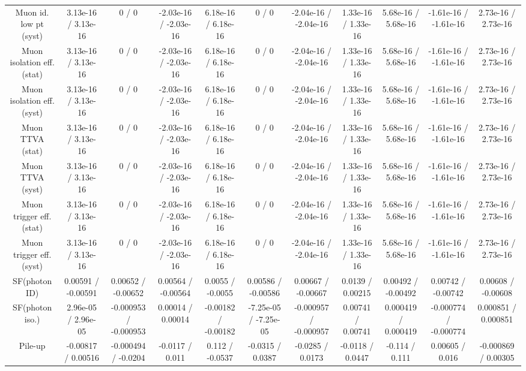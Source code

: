 \begin{table}[htbp]
\begin{center}
\begin{tabular}{|c|c|c|c|c|c|c|c|c|c|c|}
  Muon id. low pt (syst) & 3.13e-16 / 3.13e-16 & 0 / 0 & -2.03e-16 / -2.03e-16 & 6.18e-16 / 6.18e-16 & 0 / 0 & -2.04e-16 / -2.04e-16 & 1.33e-16 / 1.33e-16 & 5.68e-16 / 5.68e-16 & -1.61e-16 / -1.61e-16 & 2.73e-16 / 2.73e-16 \\ 
  Muon isolation eff. (stat) & 3.13e-16 / 3.13e-16 & 0 / 0 & -2.03e-16 / -2.03e-16 & 6.18e-16 / 6.18e-16 & 0 / 0 & -2.04e-16 / -2.04e-16 & 1.33e-16 / 1.33e-16 & 5.68e-16 / 5.68e-16 & -1.61e-16 / -1.61e-16 & 2.73e-16 / 2.73e-16 \\ 
  Muon isolation eff. (syst) & 3.13e-16 / 3.13e-16 & 0 / 0 & -2.03e-16 / -2.03e-16 & 6.18e-16 / 6.18e-16 & 0 / 0 & -2.04e-16 / -2.04e-16 & 1.33e-16 / 1.33e-16 & 5.68e-16 / 5.68e-16 & -1.61e-16 / -1.61e-16 & 2.73e-16 / 2.73e-16 \\ 
  Muon TTVA (stat) & 3.13e-16 / 3.13e-16 & 0 / 0 & -2.03e-16 / -2.03e-16 & 6.18e-16 / 6.18e-16 & 0 / 0 & -2.04e-16 / -2.04e-16 & 1.33e-16 / 1.33e-16 & 5.68e-16 / 5.68e-16 & -1.61e-16 / -1.61e-16 & 2.73e-16 / 2.73e-16 \\ 
  Muon TTVA (syst) & 3.13e-16 / 3.13e-16 & 0 / 0 & -2.03e-16 / -2.03e-16 & 6.18e-16 / 6.18e-16 & 0 / 0 & -2.04e-16 / -2.04e-16 & 1.33e-16 / 1.33e-16 & 5.68e-16 / 5.68e-16 & -1.61e-16 / -1.61e-16 & 2.73e-16 / 2.73e-16 \\ 
  Muon trigger eff. (stat) & 3.13e-16 / 3.13e-16 & 0 / 0 & -2.03e-16 / -2.03e-16 & 6.18e-16 / 6.18e-16 & 0 / 0 & -2.04e-16 / -2.04e-16 & 1.33e-16 / 1.33e-16 & 5.68e-16 / 5.68e-16 & -1.61e-16 / -1.61e-16 & 2.73e-16 / 2.73e-16 \\ 
  Muon trigger eff. (syst) & 3.13e-16 / 3.13e-16 & 0 / 0 & -2.03e-16 / -2.03e-16 & 6.18e-16 / 6.18e-16 & 0 / 0 & -2.04e-16 / -2.04e-16 & 1.33e-16 / 1.33e-16 & 5.68e-16 / 5.68e-16 & -1.61e-16 / -1.61e-16 & 2.73e-16 / 2.73e-16 \\ 
  SF(photon ID) & 0.00591 / -0.00591 & 0.00652 / -0.00652 & 0.00564 / -0.00564 & 0.0055 / -0.0055 & 0.00586 / -0.00586 & 0.00667 / -0.00667 & 0.0139 / 0.00215 & 0.00492 / -0.00492 & 0.00742 / -0.00742 & 0.00608 / -0.00608 \\ 
  SF(photon iso.) & 2.96e-05 / 2.96e-05 & -0.000953 / -0.000953 & 0.00014 / 0.00014 & -0.00182 / -0.00182 & -7.25e-05 / -7.25e-05 & -0.000957 / -0.000957 & 0.00741 / 0.00741 & 0.000419 / 0.000419 & -0.000774 / -0.000774 & 0.000851 / 0.000851 \\ 
  Pile-up & -0.00817 / 0.00516 & -0.000494 / -0.0204 & -0.0117 / 0.011 & 0.112 / -0.0537 & -0.0315 / 0.0387 & -0.0285 / 0.0173 & -0.0118 / 0.0447 & -0.114 / 0.111 & 0.00605 / 0.016 & -0.000869 / 0.00305 \\ 

\end{tabular}
\end{center}
\end{table}
